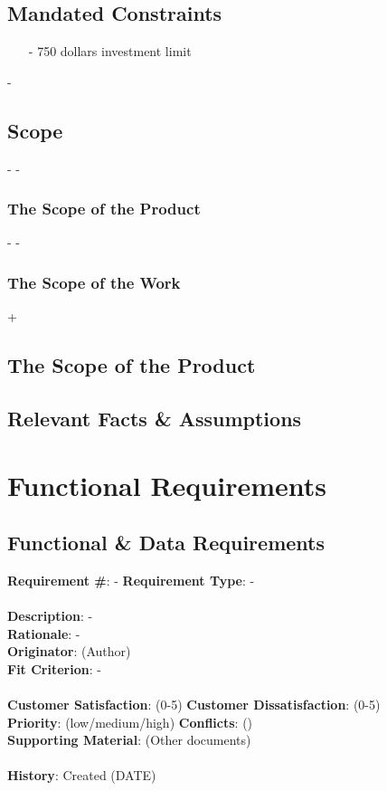 \documentclass[titlepage]{article}
\begin{document}
 \subsection{Mandated Constraints}%
 \begin{itemize}
  	\item[-] 750 dollars investment limit
  \end{itemize}
  
 -\subsection{Scope}
 -%
 -\subsubsection{The Scope of the Product}
 -%
 -\subsubsection{The Scope of the Work}
 +\subsection{The Scope of the Product}
  \subsection{Relevant Facts \& Assumptions}
 
 
 \section{Functional Requirements}
 \subsection{Functional \& Data Requirements}
 \begin{framed}
 \noindent\textbf{Requirement \#}: - \hfill \textbf{Requirement Type}: - \hfill\\\\
 \noindent\textbf{Description}: -\\
 \textbf{Rationale}: -\\
 \textbf{Originator}: (Author)\\
 \textbf{Fit Criterion}: -\\\\
 \noindent\textbf{Customer Satisfaction}: (0-5) \hfill 	\textbf{Customer Dissatisfaction}: (0-5) \hfill\\
 \textbf{Priority}: (low/medium/high) \hfill \textbf{Conflicts}: () \hfill 		\\
 \textbf{Supporting Material}: (Other documents)\\\\
 \noindent\textbf{History}: Created (DATE)
 \end{framed}
 
\end{document}
